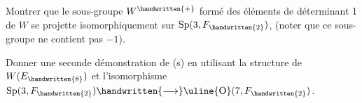 Montrer que le sous-groupe $W^{\handwritten{+}}$ formé des éléments de déterminant 1 de $W$ se projette isomorphiquement sur $\operatorname{Sp}(3,F_{\handwritten{2}})$, (noter que ce sous-groupe ne contient pas $-1$).

Donner une seconde démonstration de (s) en utilisant la structure de $W(E_{\handwritten{8}})$ et l'isomorphisme $\operatorname{Sp}(3,F_{\handwritten{2}})\handwritten{\longrightarrow}\uline{\operatorname{O}}(7,F_{\handwritten{2}})$.
